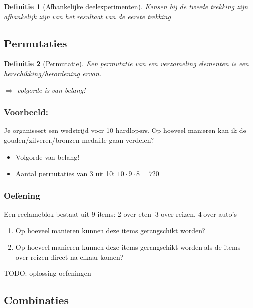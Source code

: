\documentclass{article}
\newtheorem{theorem}{Definitie}[section]
\begin{document}
\begin{theorem}[Afhankelijke deelexperimenten]
    Kansen bij de tweede trekking zijn afhankelijk zijn van het resultaat van de eerste trekking
\end{theorem}

\subsection{Permutaties}

\begin{theorem}[Permutatie]
    Een permutatie van een verzameling elementen is een herschikking/herordening ervan.

    $\Rightarrow$ volgorde is van belang! 
\end{theorem}

\subsubsection{Voorbeeld:} 

Je organiseert een wedstrijd voor 10 hardlopers. 
Op hoeveel manieren kan ik de gouden/zilveren/bronzen medaille gaan verdelen?

\begin{itemize}
    \item Volgorde van belang!
    \item Aantal permutaties van 3 uit 10: $10 \cdot 9 \cdot 8 = 720$
\end{itemize}

\subsubsection{Oefening}

Een reclameblok bestaat uit 9 items: 2 over eten, 3 over reizen, 4 over auto's

\begin{enumerate}
    \item Op hoeveel manieren kunnen deze items gerangschikt worden?
    \item Op hoeveel manieren kunnen deze items gerangschikt worden als de items over reizen direct na elkaar komen?
\end{enumerate}

TODO: oplossing oefeningen

\subsection{Combinaties}
\end{document}
